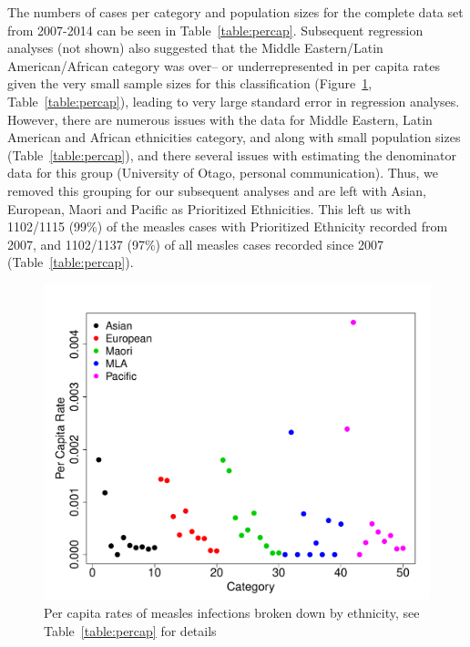 \documentclass{article}
\begin{document}
The numbers of cases per category and population sizes for the complete data set from 2007-2014 can be seen in Table~\ref{table:percap}. Subsequent regression analyses (not shown) also suggested that the Middle Eastern/Latin American/African category was over-- or underrepresented in per capita rates given the very small sample sizes for this classification (Figure~\ref{fig:percap}, Table~\ref{table:percap}), leading to very large standard error in regression analyses. However, there are numerous issues with the data for Middle Eastern, Latin American and African ethnicities category, and along with small population sizes (Table~\ref{table:percap}), and there several issues with estimating the denominator data for this group (University of Otago, personal communication). Thus, we removed this grouping for our subsequent analyses and are left with Asian, European, Maori and Pacific as Prioritized Ethnicities. This left us with 1102/1115 (99\%) of the measles cases with Prioritized Ethnicity recorded from 2007, and 1102/1137 (97\%) of all measles cases recorded since 2007 (Table~\ref{table:percap}).

\begin{figure}[h!]
\begin{center}
\includegraphics{interimreport2-010}
\end{center}
\caption{Per capita rates of measles infections broken down by ethnicity, see Table~\ref{table:percap} for details}
\label{fig:percap}
\end{figure}
\end{document}
